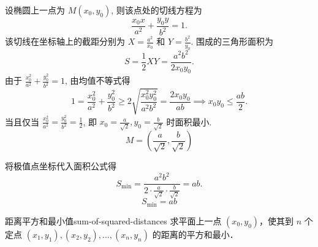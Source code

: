 \begin{solution}
    设椭圆上一点为 $M(x_0, y_0)$, 则该点处的切线方程为
    \begin{equation}
        \frac{x_0 x}{a^2} + \frac{y_0 y}{b^2} = 1 .
    \end{equation}
    该切线在坐标轴上的截距分别为 $X = \frac{a^2}{x_0}$ 和 $Y = \frac{b^2}{y_0}$. 围成的三角形面积为
    \begin{equation}
        S = \frac{1}{2} XY = \frac{a^2 b^2}{2 x_0 y_0} .
    \end{equation}
    由于 $\frac{x_0^2}{a^2} + \frac{y_0^2}{b^2} = 1$, 由均值不等式得
    \begin{equation}
        1 = \frac{x_0^2}{a^2} + \frac{y_0^2}{b^2} \ge 2 \sqrt{\frac{x_0^2 y_0^2}{a^2 b^2}} = \frac{2 x_0 y_0}{ab} \implies x_0 y_0 \le \frac{ab}{2} .
    \end{equation}
    当且仅当 $\frac{x_0^2}{a^2} = \frac{y_0^2}{b^2} = \frac{1}{2}$, 即 $x_0 = \frac{a}{\sqrt{2}}, y_0 = \frac{b}{\sqrt{2}}$ 时面积最小.
    \begin{equation}
        \boxed{M = \left( \frac{a}{\sqrt{2}}, \frac{b}{\sqrt{2}} \right)}
    \end{equation}

    将极值点坐标代入面积公式得
    \begin{equation}
        S_{\min} = \frac{a^2 b^2}{2 \cdot \frac{a}{\sqrt{2}} \cdot \frac{b}{\sqrt{2}}} = ab .
    \end{equation}
    \begin{equation}
        \boxed{S_{\min} = ab}
    \end{equation}
\end{solution}


\begin{problem}{距离平方和最小值}{sum-of-squared-distances}
    求平面上一点 $(x_0, y_0)$，使其到 $n$ 个定点 $(x_1, y_1), (x_2, y_2), \dots, (x_n, y_n)$ 的距离的平方和最小．
\end{problem}

